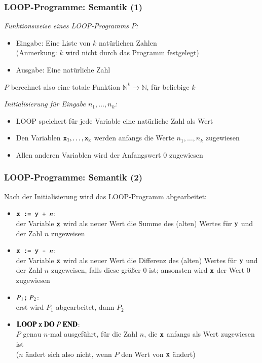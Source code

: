 \documentclass[onlymath]{beamer}
\begin{document}
\begin{frame}\frametitle{LOOP-Programme: Semantik (1)}

\emph{Funktionsweise eines LOOP-Programms $P$:}
\begin{itemize}
\item \alert{Eingabe:} Eine Liste von $k$ natürlichen Zahlen\\
(Anmerkung: $k$ wird nicht durch das Programm festgelegt)
\item \alert{Ausgabe:} Eine natürliche Zahl
\end{itemize}
$P$ berechnet also eine totale Funktion $\mathbb{N}^k\to \mathbb{N}$, für beliebige $k$
\bigskip\pause

\emph{Initialisierung für Eingabe $n_1,\ldots,n_k$:}
\begin{itemize}
\item LOOP speichert für jede Variable eine natürliche Zahl als Wert
\item Den Variablen $\texttt{x}_{\texttt{1}},\ldots,\texttt{x}_{\texttt{k}}$ werden anfangs die Werte $n_1,\ldots,n_k$ zugewiesen
\item Allen anderen Variablen wird der Anfangswert $0$ zugewiesen

\end{itemize}

\end{frame}

\begin{frame}\frametitle{LOOP-Programme: Semantik (2)}

Nach der Initialisierung wird das LOOP-Programm abgearbeitet:
\begin{itemize}
\item $\texttt{x} \texttt{ := } \texttt{y} \texttt{ + } n$:\\
der Variable $\texttt{x}$ wird als neuer Wert die Summe des (alten) Wertes für $\texttt{y}$ und der Zahl $n$ zugeweisen
\item $\texttt{x} \texttt{ := } \texttt{y} \texttt{ - } n$:\\
der Variable $\texttt{x}$ wird als neuer Wert die Differenz des (alten) Wertes für $\texttt{y}$ und der Zahl $n$ zugeweisen, falls diese größer $0$ ist; ansonsten wird $\texttt{x}$ der Wert $0$ zugewiesen
\item $P_1\texttt{;}{}~P_2$:\\
erst wird $P_1$ abgearbeitet, dann $P_2$
\item $\textbf{LOOP}~\texttt{x}~\textbf{DO}~P~\textbf{END}{}$:\\
$P$ genau $n$-mal ausgeführt, für die Zahl $n$, die $\texttt{x}$ anfangs als Wert zugewiesen ist\\
\textcolor{devilscss}{($n$ ändert sich also nicht, wenn $P$ den Wert von $\texttt{x}$ ändert)}
\end{itemize}

\end{frame}
\end{document}
